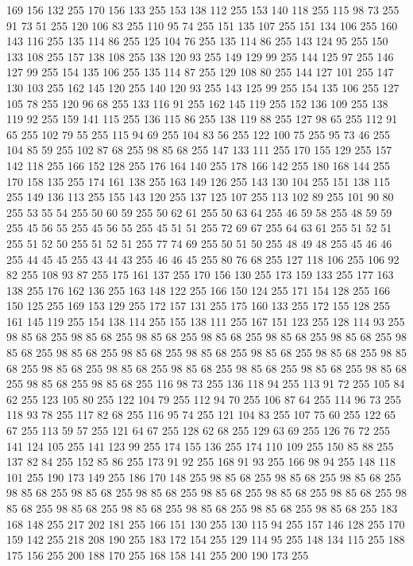 169 156 132 255 170 156 133 255 153 138 112 255 153 140 118 255 115 98 73 255 91 73 51 255 120 106 83 255 110 95 74 255 151 135 107 255 151 134 106 255 160 143 116 255 135 114 86 255 125 104 76 255 135 114 86 255 143 124 95 255 150 133 108 255 157 138 108 255 138 120 93 255 149 129 99 255 144 125 97 255 146 127 99 255 154 135 106 255 135 114 87 255 129 108 80 255 144 127 101 255 147 130 103 255 162 145 120 255 140 120 93 255 143 125 99 255 154 135 106 255 127 105 78 255 120 96 68 255 133 116 91 255 162 145 119 255 152 136 109 255 138 119 92 255 159 141 115 255 136 115 86 255 138 119 88 255 127 98 65 255 112 91 65 255 102 79 55 255 115 94 69 255 104 83 56 255 122 100 75 255 95 73 46 255 104 85 59 255 102 87 68 255 98 85 68 255 147 133 111 255 170 155 129 255 157 142 118 255 166 152 128 255 176 164 140 255 178 166 142 255 180 168 144 255 170 158 135 255 174 161 138 255 163 149 126 255 143 130 104 255 151 138 115 255 149 136 113 255 155 143 120 255 137 125 107 255
113 102 89 255 101 90 80 255 53 55 54 255 50 60 59 255 50 62 61 255 50 63 64 255 46 59 58 255 48 59 59 255 45 56 55 255 45 56 55 255 45 51 51 255 72 69 67 255 64 63 61 255 51 52 51 255 51 52 50 255 51 52 51 255 77 74 69 255 50 51 50 255 48 49 48 255 45 46 46 255 44 45 45 255 43 44 43 255 46 46 45 255 80 76 68 255 127 118 106 255 106 92 82 255 108 93 87 255 175 161 137 255 170 156 130 255 173 159 133 255 177 163 138 255 176 162 136 255 163 148 122 255 166 150 124 255 171 154 128 255 166 150 125 255 169 153 129 255 172 157 131 255 175 160 133 255 172 155 128 255 161 145 119 255 154 138 114 255 155 138 111 255 167 151 123 255 128 114 93 255 98 85 68 255 98 85 68 255 98 85 68 255 98 85 68 255 98 85 68 255 98 85 68 255 98 85 68 255 98 85 68 255 98 85 68 255 98 85 68 255 98 85 68 255 98 85 68 255 98 85 68 255 98 85 68 255 98 85 68 255 98 85 68 255 98 85 68 255 98 85 68 255 98 85 68 255
98 85 68 255 98 85 68 255 116 98 73 255 136 118 94 255 113 91 72 255 105 84 62 255 123 105 80 255 122 104 79 255 112 94 70 255 106 87 64 255 114 96 73 255 118 93 78 255 117 82 68 255 116 95 74 255 121 104 83 255 107 75 60 255 122 65 67 255 113 59 57 255 121 64 67 255 128 62 68 255 129 63 69 255 126 76 72 255 141 124 105 255 141 123 99 255 174 155 136 255 174 110 109 255 150 85 88 255 137 82 84 255 152 85 86 255 173 91 92 255 168 91 93 255 166 98 94 255 148 118 101 255 190 173 149 255 186 170 148 255 98 85 68 255 98 85 68 255 98 85 68 255 98 85 68 255 98 85 68 255 98 85 68 255 98 85 68 255 98 85 68 255 98 85 68 255 98 85 68 255 98 85 68 255 98 85 68 255 98 85 68 255 98 85 68 255 98 85 68 255 183 168 148 255 217 202 181 255 166 151 130 255 130 115 94 255 157 146 128 255 170 159 142 255 218 208 190 255 183 172 154 255 129 114 95 255 148 134 115 255 188 175 156 255 200 188 170 255 168 158 141 255 200 190 173 255
